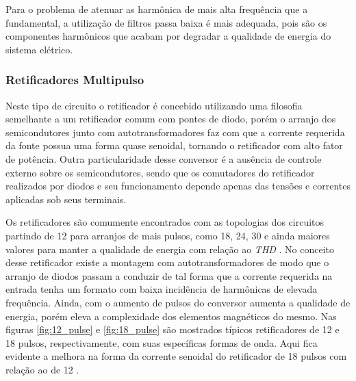 Para o problema de atenuar as harmônica de mais alta frequência que a fundamental, a utilização de filtros passa baixa é mais adequada, pois são os componentes harmônicos que acabam por degradar a qualidade de energia do sistema elétrico.

\subsubsection{Retificadores Multipulso}

Neste tipo de circuito o retificador é concebido utilizando uma filosofia semelhante a um retificador comum com pontes de diodo, porém o arranjo dos semicondutores junto com autotransformadores faz com que a corrente requerida da fonte possua uma forma quase senoidal, tornando o retificador com alto fator de potência. Outra particularidade desse conversor é a ausência de controle externo sobre os semicondutores, sendo que os comutadores do retificador realizados por diodos e seu funcionamento depende apenas das tensões e correntes aplicadas sob seus terminais.

Os retificadores são comumente encontrados com as topologias dos circuitos partindo de 12 para arranjos de mais pulsos, como 18, 24, 30 e ainda maiores valores para manter a qualidade de energia  com relação ao \textit{THD} \cite{Singh2008}. No conceito desse retificador existe a montagem com autotransformadores de modo que o arranjo de diodos passam a conduzir de tal forma que a corrente requerida na entrada tenha um formato com baixa incidência de harmônicas de elevada frequência. Ainda, com o aumento de pulsos do conversor aumenta a qualidade de energia, porém eleva a complexidade dos elementos magnéticos do mesmo. Nas figuras \ref{fig:12_pulse} e \ref{fig:18_pulse} são mostrados típicos retificadores de 12 e 18 pulsos, respectivamente, com suas específicas formas de onda. Aqui fica evidente a melhora na forma da corrente senoidal do retificador de 18 pulsos com relação ao de 12 \cite{Singh2008}.

